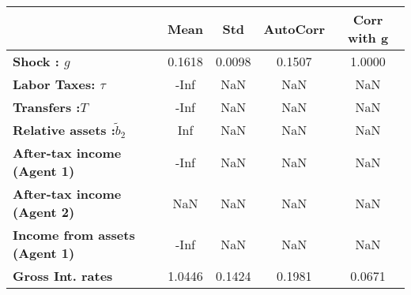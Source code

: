 \begin{tiny}\begin{tabular}{|l|c|c|c|c|}
\hline
&\textbf{Mean}&\textbf{Std}&\textbf{AutoCorr}&\textbf{Corr with g}\\\hline
\textbf{Shock : $g$}&0.1618&0.0098&0.1507&1.0000\\\hline
\textbf{Labor Taxes: $\tau$}&-Inf&NaN&NaN&NaN\\\hline
\textbf{Transfers :$T$}&-Inf&NaN&NaN&NaN\\\hline
\textbf{Relative assets  :$\tilde{b}_2$}&Inf&NaN&NaN&NaN\\\hline
\textbf{After-tax income (Agent 1)}&-Inf&NaN&NaN&NaN\\\hline
\textbf{After-tax income (Agent 2)}&NaN&NaN&NaN&NaN\\\hline
\textbf{Income from assets (Agent 1)}&-Inf&NaN&NaN&NaN\\\hline
\textbf{Gross Int. rates}&1.0446&0.1424&0.1981&0.0671\\\hline
\end{tabular}
\end{tiny}